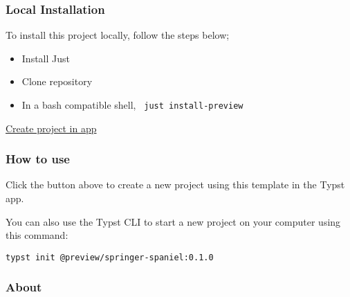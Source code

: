 \subsubsection{Local Installation}\label{local-installation}

To install this project locally, follow the steps below;

\begin{itemize}
\tightlist
\item
  Install Just
\item
  Clone repository
\item
  In a bash compatible shell, \texttt{\ just\ install-preview\ }
\end{itemize}

\href{/app?template=springer-spaniel&version=0.1.0}{Create project in
app}

\subsubsection{How to use}\label{how-to-use}

Click the button above to create a new project using this template in
the Typst app.

You can also use the Typst CLI to start a new project on your computer
using this command:

\begin{verbatim}
typst init @preview/springer-spaniel:0.1.0
\end{verbatim}



\subsubsection{About}\label{about}

